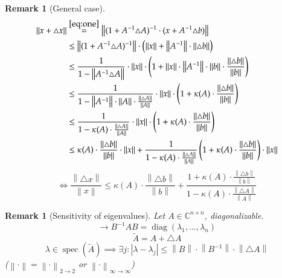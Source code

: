 \documentclass[a4paper]{article}
\newcounter{lecref}[section]
\numberwithin{lecref}{section}
\newtheorem{remark}[lecref]{Remark}
\newcommand{\norm}[1]{\left\|#1\right\|}
\newcommand{\card}[1]{\left|#1\right|}
\begin{document}
\begin{remark}[General case]
  \begin{align}
    \norm{x + \triangle x} &\overset{\eqref{eq:one}}{=} \norm{(1 + A^{-1} \triangle A)^{-1} \cdot (x + A^{-1} \triangle b)} \label{eq:three} \\
      &\leq \norm{(1 + A^{-1} \triangle A)^{-1}} \cdot \left(\norm{x} + \norm{A^{-1}} \cdot \norm{\triangle b}\right) \nonumber \\
      &\leq \frac{1}{1 - \norm{A^{-1} \triangle A}} \cdot \norm{x} \cdot \left(1 + \norm{x} \cdot \norm{A^{-1}} \cdot \norm{b} \cdot \frac{\norm{\triangle b}}{\norm{b}}\right) \nonumber \\
      &\leq \frac{1}{1 - \norm{A^{-1}} \cdot \norm{A} \cdot \frac{\norm{\triangle A}}{\norm{A}}} \cdot \norm{x} \cdot \left(1 + \kappa(A) \cdot \frac{\norm{\triangle b}}{\norm{b}}\right) \nonumber \\
      &\leq \frac{1}{1 - \kappa(A) \cdot \frac{\norm{\triangle A}}{\norm{A}}} \cdot \norm{x} \cdot \left(1 + \kappa(A) \cdot \frac{\norm{\triangle b}}{\norm{b}}\right) \nonumber \\
      &\leq \kappa(A) \cdot \frac{\norm{\triangle b}}{\norm{b}} \cdot \norm{x} + \frac{1}{1 - \kappa(A) \cdot \frac{\norm{\triangle A}}{\norm{A}}} \left(1 + \kappa(A) \cdot \frac{\norm{\triangle b}}{\norm{b}}\right) \cdot \norm{x}
  \end{align}
  \[ \iff \frac{\norm{\triangle x}}{\norm{x}} \leq \kappa(A) \cdot \frac{\norm{\triangle b}}{\norm{b}} + \frac{1 + \kappa(A) \cdot \frac{\norm{\triangle b}}{\norm{b}}}{1 - \kappa(A) \cdot \frac{\norm{\triangle A}}{\norm{A}}} \]
\end{remark}

\begin{remark}[Sensitivity of eigenvalues] %
  Let $A \in \mathbb C^{n \times n}$, diagonalizable.
  \[ \to B^{-1} AB = \operatorname{diag}(\lambda_1, \dots, \lambda_n) \]
  \[ \tilde A = A + \triangle A \]
  \[ \lambda \in \operatorname{spec}(\tilde A) \implies \exists j: \card{\lambda - \lambda_j} \leq \norm{B} \cdot \norm{B^{-1}} \cdot \norm{\triangle A} \]
  ($\norm{\cdot} = \norm{\cdot}_{2 \to 2}$ or $\norm{\cdot}_{\infty\to\infty}$)
\end{remark}
\end{document}
